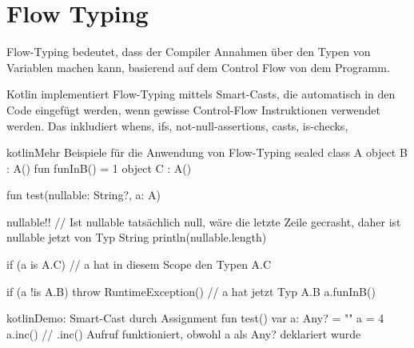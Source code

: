 
\section{Flow Typing}\label{sec:flow-typing}

\renewcommand{\kapitelautor}{Autor: Marvin Kurka}

Flow-Typing bedeutet, dass der Compiler Annahmen über den Typen von Variablen machen kann, basierend auf dem Control
Flow von dem Programm.


Kotlin implementiert Flow-Typing mittels Smart-Casts, die automatisch in den Code eingefügt werden, wenn gewisse
Control-Flow Instruktionen verwendet werden.
Das inkludiert \zB whens, ifs, not-null-assertions, casts, is-checks, \usw

\begin{codeBlock}{kotlin}{Mehr Beispiele für die Anwendung von Flow-Typing}
sealed class A {
    object B : A() {
        fun funInB() = 1
    }
    object C : A()
}

fun test(nullable: String?, a: A) {
    nullable!!
    // Ist nullable tatsächlich null, wäre die letzte Zeile gecrasht, daher ist nullable jetzt von Typ String
    println(nullable.length)

    if (a is A.C) {
        // a hat in diesem Scope den Typen A.C
    }

    if (a !is A.B) throw RuntimeException()
    // a hat jetzt Typ A.B
    a.funInB()
}
\end{codeBlock}

\begin{codeBlock}{kotlin}{Demo: Smart-Cast durch Assignment}
fun test() {
    var a: Any? = ""
    a = 4
    a.inc() // .inc() Aufruf funktioniert, obwohl a als Any? deklariert wurde
}
\end{codeBlock}

